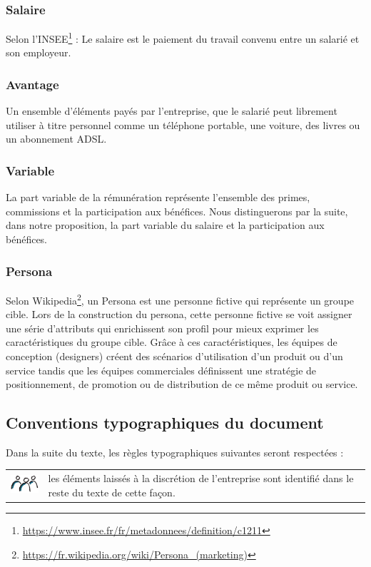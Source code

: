 \documentclass[12pt]{article}
\newcommand{\assemblee}[1]{%
  \begin{tcolorbox}[colframe=DarkPlum,boxrule=2pt,arc=4pt,left=6pt,right=6pt,top=6pt,bottom=6pt,boxsep=0pt,colback=white]
    \begin{tabular}{m{1.5cm} m{11cm}}
      \includegraphics[width=1.5cm]{includes/team} & #1 \\
    \end{tabular}
  \end{tcolorbox}
}
\begin{document}
\subsubsection{Salaire}
 Selon l’INSEE\footnote{\url{https://www.insee.fr/fr/metadonnees/definition/c1211}} : Le salaire est le paiement du travail convenu entre un salarié et son employeur. 

\subsubsection{Avantage}
 Un ensemble d’éléments payés par l’entreprise, que le salarié peut librement utiliser à titre personnel comme un téléphone portable, une voiture, des livres ou un abonnement ADSL.

\subsubsection{Variable}
 La part variable de la rémunération représente l’ensemble des primes, commissions et la participation aux bénéfices.
 Nous distinguerons par la suite, dans notre proposition, la part variable du salaire et la participation aux bénéfices.

\subsubsection{Persona}
 Selon Wikipedia\footnote{\url{https://fr.wikipedia.org/wiki/Persona\_(marketing)}}, un Persona est une personne fictive qui représente un groupe cible. Lors de la construction du persona, cette personne fictive se voit assigner une série d'attributs qui enrichissent son profil pour mieux exprimer les caractéristiques du groupe cible. Grâce à ces caractéristiques, les équipes de conception (designers) créent des scénarios d'utilisation d'un produit ou d'un service tandis que les équipes commerciales définissent une stratégie de positionnement, de promotion ou de distribution de ce même produit ou service.

\subsection{Conventions typographiques du document}
  Dans la suite du texte, les règles typographiques suivantes seront respectées :

  \assemblee{les éléments laissés à la discrétion de l'entreprise sont identifié dans le reste du texte de cette façon.}
\end{document}
